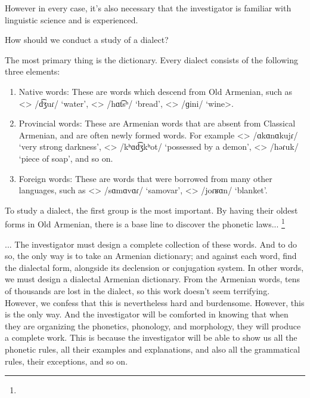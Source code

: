 However in every case, it's also necessary that the investigator is familiar with linguistic science and is experienced. 

How should we conduct a study of a dialect?

The most primary thing is the dictionary. Every dialect consists of the following three elements:
\begin{enumerate}
	\item Native words: These are words which descend from Old Armenian, such as <> /d͡ʒuɾ/ `water', <> /hɑt͡sʰ/ `bread', <> /ɡini/ `wine>.
	\item Provincial words: These are Armenian words that are absent from Classical Armenian, and are often newly formed words. For example <> /ɑkɑnɑkujɾ/ `very strong darkness', <> /kʰɑd͡ʒkʰot/ `possessed by a demon', <> /həɾuk/ `piece of soap', and so on. 
	\item Foreign words: These are words that were borrowed from many other languages, such as <> /sɑmɑvɑɾ/ `samovar', <> /joɾʁɑn/ `blanket'.
\end{enumerate}

To study a dialect, the first group is the most important. By having their oldest forms in Old Armenian, there is a base line to discover the phonetic laws... \footnote{} 



\begin{adjarianpage}\label{page:12}\end{adjarianpage}%

... The investigator must design a complete collection of these words. And to do so, the only way is to take an Armenian dictionary; and against each word, find the dialectal form, alongside its declension or conjugation system. In other words, we must design a dialectal Armenian dictionary. From the Armenian words, tens of thousands are lost in the dialect, so this work doesn't seem terrifying. However, we confess that this is nevertheless hard and burdensome. However, this is the only way. And the investigator will be comforted in knowing that when they are organizing the phonetics, phonology, and morphology, they will produce a complete work. This is because the investigator will be able to show us all the phonetic rules, all their examples and explanations, and also all the grammatical rules, their exceptions, and so on. 

